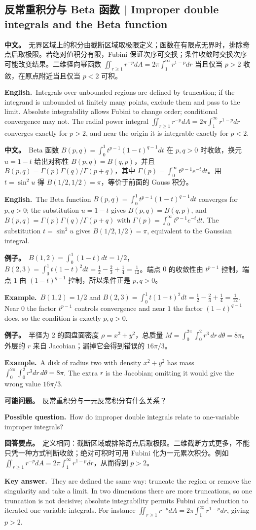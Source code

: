 \documentclass[UTF8,11pt,a4paper]{ctexart}
\newcommand{\BOTH}[2]{\par\noindent\textbf{中文。}\ #1\par\noindent\textbf{English.}\ #2\par}
\newcommand{\EX}[2]{\par\noindent\textbf{例子。}\ #1\par\noindent\textbf{Example.}\ #2\par}
\newcommand{\ASK}[4]{\begin{samepage}\par\noindent\textbf{可能问题。}\ #1\par\noindent\textbf{Possible question.}\ #2\par\noindent\textbf{回答要点。}\ #3\par\noindent\textbf{Key answer.}\ #4\medskip\end{samepage}}
\begin{document}
\subsection{反常重积分与 Beta 函数 | Improper double integrals and the Beta function}
\BOTH{无界区域上的积分由截断区域取极限定义；函数在有限点无界时，排除奇点后取极限。若绝对值积分有限，Fubini 保证次序可交换；条件收敛时交换次序可能改变结果。二维径向幂函数 $\iint_{r\ge1}r^{-p}dA=2\pi\int_1^\infty r^{1-p}dr$ 当且仅当 $p>2$ 收敛，在原点附近当且仅当 $p<2$ 可积。}{Integrals over unbounded regions are defined by truncation; if the integrand is unbounded at finitely many points, exclude them and pass to the limit. Absolute integrability allows Fubini to change order; conditional convergence may not. The radial power integral $\iint_{r\ge1}r^{-p}dA=2\pi\int_1^\infty r^{1-p}dr$ converges exactly for $p>2$, and near the origin it is integrable exactly for $p<2$.}
\BOTH{Beta 函数 $B(p,q)=\int_0^1t^{p-1}(1-t)^{q-1}dt$ 在 $p,q>0$ 时收敛，换元 $u=1-t$ 给出对称性 $B(p,q)=B(q,p)$，并且 $B(p,q)=\Gamma(p)\Gamma(q)/\Gamma(p+q)$，其中 $\Gamma(p)=\int_0^\infty t^{p-1}e^{-t}dt$。用 $t=\sin^2u$ 得 $B(1/2,1/2)=\pi$，等价于前面的 Gauss 积分。}{The Beta function $B(p,q)=\int_0^1t^{p-1}(1-t)^{q-1}dt$ converges for $p,q>0$; the substitution $u=1-t$ gives $B(p,q)=B(q,p)$, and $B(p,q)=\Gamma(p)\Gamma(q)/\Gamma(p+q)$ with $\Gamma(p)=\int_0^\infty t^{p-1}e^{-t}dt$. The substitution $t=\sin^2u$ gives $B(1/2,1/2)=\pi$, equivalent to the Gaussian integral.}
\EX{$B(1,2)=\int_0^1(1-t)dt=1/2$，$B(2,3)=\int_0^1t(1-t)^2dt=\frac12-\frac23+\frac14=\frac1{12}$。端点 $0$ 的收敛性由 $t^{p-1}$ 控制，端点 $1$ 由 $(1-t)^{q-1}$ 控制，所以条件正是 $p,q>0$。}{$B(1,2)=1/2$ and $B(2,3)=\int_0^1t(1-t)^2dt=\frac12-\frac23+\frac14=\frac1{12}$. Near $0$ the factor $t^{p-1}$ controls convergence and near $1$ the factor $(1-t)^{q-1}$ does, so the condition is exactly $p,q>0$.}
\EX{半径为 $2$ 的圆盘面密度 $\rho=x^2+y^2$，总质量 $M=\int_0^{2\pi}\int_0^2r^3\,dr\,d\theta=8\pi$。外层的 $r$ 来自 Jacobian；漏掉它会得到错误的 $16\pi/3$。}{A disk of radius two with density $x^2+y^2$ has mass $\int_0^{2\pi}\int_0^2r^3dr\,d\theta=8\pi$. The extra $r$ is the Jacobian; omitting it would give the wrong value $16\pi/3$.}
\ASK{反常重积分与一元反常积分有什么关系？}{How do improper double integrals relate to one-variable improper integrals?}{定义相同：截断区域或排除奇点后取极限。二维截断方式更多，不能只凭一种方式判断收敛；绝对可积时可用 Fubini 化为一元累次积分。例如 $\iint_{r\ge1}r^{-p}dA=2\pi\int_1^\infty r^{1-p}dr$，从而得到 $p>2$。}{They are defined the same way: truncate the region or remove the singularity and take a limit. In two dimensions there are more truncations, so one truncation is not decisive; absolute integrability permits Fubini and reduction to iterated one-variable integrals. For instance $\iint_{r\ge1}r^{-p}dA=2\pi\int_1^\infty r^{1-p}dr$, giving $p>2$.}
\end{document}
